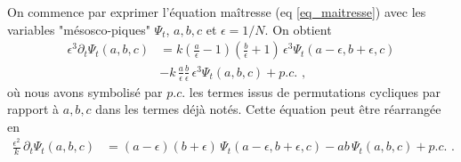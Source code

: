 \documentclass[openany,a4paper,12pt]{article}
\begin{document}
\par On commence par exprimer l'équation maîtresse (eq \ref{eq_maitresse}) avec les variables "mésosco-piques" $\Psi_t$, $a,b,c$ et $\epsilon=1/N$. On obtient
%
\begin{equation}\label{eq_maitresse_minuscules}
\begin{split}
	\epsilon ^3 \partial_t \Psi_t(a,b,c) 
	&= k \left( \frac a \epsilon - 1 \right) \left( \frac b \epsilon + 1\right)  \, \epsilon^3 \Psi_t(a-\epsilon, b+\epsilon, c) \\
	&- k\, \frac a \epsilon \frac b \epsilon \, \epsilon^3 \Psi_t(a,b,c) + p.c. \,\, ,
\end{split}
\end{equation}
%
où nous avons symbolisé par $p.c.$ les termes issus de permutations cycliques par rapport à $a,b,c$ dans les termes déjà notés. Cette équation peut être réarrangée en
%
\begin{equation}\label{eq_maitresse_minuscules_clean}
\begin{split}
	\frac{\epsilon^2}{k}\, \partial_t \Psi_t(a,b,c) 
	&= (a-\epsilon)(b+\epsilon)  \, \Psi_t(a-\epsilon, b+\epsilon, c) 
	- ab \, \Psi_t(a,b,c) + p.c. \,\, .
\end{split}
\end{equation}
%
\end{document}
